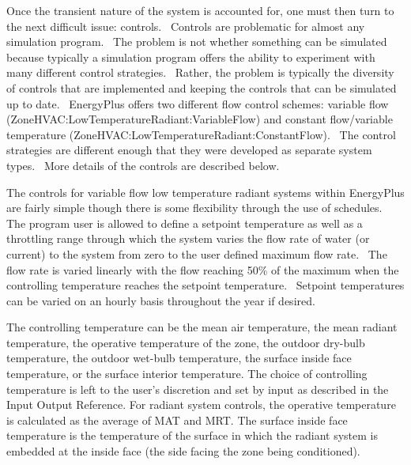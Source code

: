 Once the transient nature of the system is accounted for, one must then turn to the next difficult issue: controls.~ Controls are problematic for almost any simulation program.~ The problem is not whether something can be simulated because typically a simulation program offers the ability to experiment with many different control strategies.~ Rather, the problem is typically the diversity of controls that are implemented and keeping the controls that can be simulated up to date.~ EnergyPlus offers two different flow control schemes: variable flow (ZoneHVAC:LowTemperatureRadiant:VariableFlow) and constant flow/variable temperature (ZoneHVAC:LowTemperatureRadiant:ConstantFlow).~ The control strategies are different enough that they were developed as separate system types.~ More details of the controls are described below.

The controls for variable flow low temperature radiant systems within EnergyPlus are fairly simple though there is some flexibility through the use of schedules.~ The program user is allowed to define a setpoint temperature as well as a throttling range through which the system varies the flow rate of water (or current) to the system from zero to the user defined maximum flow rate.~ The flow rate is varied linearly with the flow reaching 50\% of the maximum when the controlling temperature reaches the setpoint temperature.~ Setpoint temperatures can be varied on an hourly basis throughout the year if desired.

The controlling temperature can be the mean air temperature, the mean radiant temperature, the operative temperature of the zone, the outdoor dry-bulb temperature, the outdoor wet-bulb temperature, the surface inside face temperature, or the surface interior temperature.  The choice of controlling temperature is left to the user's discretion and set by input as described in the Input Output Reference.  For radiant system controls, the operative temperature is calculated as the average of MAT and MRT.  The surface inside face temperature is the temperature of the surface in which the radiant system is embedded at the inside face (the side facing the zone being conditioned).

